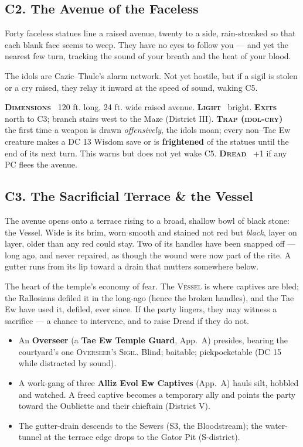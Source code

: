 \documentclass[10pt,twoside]{article}
\newcommand{\tech}[1]{\textbf{\scshape\textcolor{stone}{#1}}\ }
\newcommand{\eqname}[1]{\textsc{#1}}
\begin{document}
\subsection{C2. The Avenue of the Faceless}
\begin{readaloud}
Forty faceless statues line a raised avenue, twenty to a side, rain-streaked so that
each blank face seems to weep. They have no eyes to follow you --- and yet the
nearest few turn, tracking the sound of your breath and the heat of your blood.
\end{readaloud}
The idols are Cazic--Thule's alarm network. Not yet hostile, but if a sigil is
stolen or a cry raised, they relay it inward at the speed of sound, waking C5.

\begin{techbox}
\tech{Dimensions} 120 ft. long, 24 ft. wide raised avenue. \tech{Light} bright.
\tech{Exits} north to C3; branch stairs west to the Maze (District III).
\tech{Trap (idol-cry)} the first time a weapon is drawn \emph{offensively}, the
idols moan; every non--Tae Ew creature makes a DC 13 Wisdom save or is
\textbf{frightened} of the statues until the end of its next turn. This warns but
does not yet wake C5. \tech{Dread} +1 if any PC flees the avenue.
\end{techbox}

\subsection{C3. The Sacrificial Terrace \& the Vessel}
\begin{readaloud}
The avenue opens onto a terrace rising to a broad, shallow bowl of black stone: the
Vessel. Wide is its brim, worn smooth and stained not red but \emph{black}, layer on
layer, older than any red could stay. Two of its handles have been snapped off ---
long ago, and never repaired, as though the wound were now part of the rite. A
gutter runs from its lip toward a drain that mutters somewhere below.
\end{readaloud}
The heart of the temple's economy of fear. The \eqname{Vessel} is where captives are
bled; the Rallosians defiled it in the long-ago (hence the broken handles), and the
Tae Ew have used it, defiled, ever since. If the party lingers, they may witness a
sacrifice --- a chance to intervene, and to raise Dread if they do not.

\begin{itemize}
\item An \textbf{Overseer} (a \textbf{Tae Ew Temple Guard}, App.\ A) presides,
bearing the courtyard's one \eqname{Overseer's Sigil}. Blind; baitable; pickpocketable
(DC 15 while distracted by sound).
\item A work-gang of three \textbf{Alliz Evol Ew Captives} (App.\ A) hauls silt,
hobbled and watched. A freed captive becomes a temporary ally and points the party
toward the Oubliette and their chieftain (District V).
\item The gutter-drain descends to the Sewers (S3, the Bloodstream); the water-tunnel
at the terrace edge drops to the Gator Pit (S-district).
\end{itemize}
\end{document}
